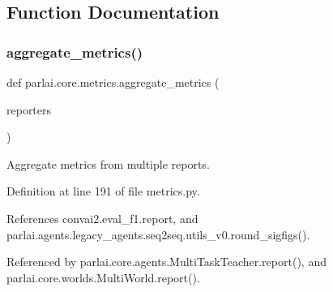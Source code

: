 \subsection{Function Documentation}
\mbox{\label{namespaceparlai_1_1core_1_1metrics_aa4ed5491962e06684b235fffe1b20fec}} 
\subsubsection{\texorpdfstring{aggregate\+\_\+metrics()}{aggregate\_metrics()}}
{\footnotesize\ttfamily def parlai.\+core.\+metrics.\+aggregate\+\_\+metrics (\begin{DoxyParamCaption}\item[{}]{reporters }\end{DoxyParamCaption})}

\begin{DoxyVerb}Aggregate metrics from multiple reports.\end{DoxyVerb}
 

Definition at line 191 of file metrics.\+py.



References convai2.\+eval\+\_\+f1.\+report, and parlai.\+agents.\+legacy\+\_\+agents.\+seq2seq.\+utils\+\_\+v0.\+round\+\_\+sigfigs().



Referenced by parlai.\+core.\+agents.\+Multi\+Task\+Teacher.\+report(), and parlai.\+core.\+worlds.\+Multi\+World.\+report().

